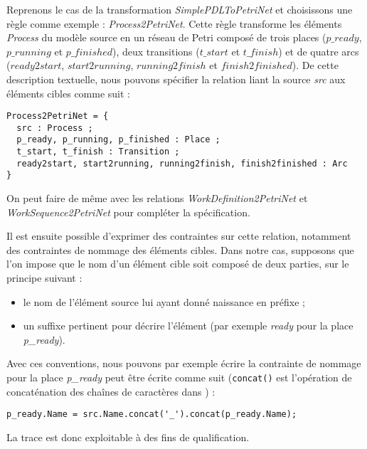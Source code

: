 Reprenons le cas de la transformation \emph{SimplePDLToPetriNet} et choisissons
une règle comme exemple : \emph{Process2PetriNet}. Cette règle transforme les
éléments \emph{Process} du modèle source en un réseau de Petri composé de trois
places ($p\_ready$, $p\_running$ et $p\_finished$), deux transitions
($t\_start$ et $t\_finish$) et de quatre arcs ($ready2start$, $start2running$,
$running2finish$ et $finish2finished$). De cette description textuelle, nous
pouvons spécifier la relation liant la source \emph{src} aux éléments cibles
comme suit :
\begin{verbatim}
Process2PetriNet = {
  src : Process ;
  p_ready, p_running, p_finished : Place ;
  t_start, t_finish : Transition ;
  ready2start, start2running, running2finish, finish2finished : Arc
}
\end{verbatim}

On peut faire de même avec les relations \emph{WorkDefinition2PetriNet} et
\emph{WorkSequence2PetriNet} pour compléter la spécification.

Il est ensuite possible d'exprimer des contraintes sur cette relation,
notamment des contraintes de nommage des éléments cibles. Dans notre cas,
supposons que l'on impose que le nom d'un élément cible soit composé de deux
parties, sur le principe suivant :
\begin{itemize}
  \item le nom de l'élément source lui ayant donné naissance en préfixe ;
  \item un suffixe pertinent pour décrire l'élément (par exemple \emph{ready}
    pour la place \emph{p\_ready}).
\end{itemize}

Avec ces conventions, nous pouvons par exemple écrire la contrainte de nommage
pour la place \emph{p\_ready} peut être écrite comme suit (\verb+concat()+ est
l'opération de concaténation des chaînes de caractères dans {\ocl}) :
\begin{verbatim}
p_ready.Name = src.Name.concat('_').concat(p_ready.Name);
\end{verbatim}

La trace est donc exploitable à des fins de qualification.




